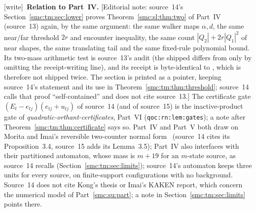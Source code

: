 \documentclass[11pt,letterpaper]{article}
\numberwithin{equation}{section}
\theoremstyle{definition}
\theoremstyle{remark}
\newcommand{\wtag}{\textup{[write]}}
\begin{document}
\wtag\ \textbf{Relation to Part~IV.} [Editorial note: source~14's Section~\ref{smc:tm:sec:lower} proves Theorem~\ref{smc:sl:thm:two} of Part~IV (source~13) again, by the same argument: the same walker maps $\alpha,d$, the same near/far threshold $2r$ and encounter inequality, the same count $|Q_2|+2r|Q_1|^2$ of near shapes, the same translating tail and the same fixed-rule polynomial bound. Its two-mass arithmetic test is source~13's audit (the shipped  differs from  only by omitting the receipt-writing line), and its receipt is byte-identical to , which is therefore not shipped twice. The section is printed as a pointer, keeping source~14's statement and its use in Theorem~\ref{smc:tm:thm:threshold}; source~14 calls that proof ``self-contained'' and does not cite source~13.] The certificate gate $(E_t-e_{tj})(e_{tj}+u_{tj})$ of source~14 (and of source~15) is the inactive-product gate of \emph{quadratic-orthant-certificates}, Part~VI (\texttt{qoc:rn:lem:gates}); a note after Theorem~\ref{smc:tm:thm:certificate} says so. Part~IV and Part~V both draw on Morita and Imai's reversible two-counter normal form~\cite{moritaimai} (source~14 cites its Proposition~3.4, source~15 adds its Lemma~3.5); Part~IV also interfaces with their partitioned automaton, whose mass is $m+19$ for an $m$-state source, as source~14 recalls (Section~\ref{smc:tm:sec:limits}); source~14's automaton keeps three units for every source, on finite-support configurations with no background. Source~14 does not cite Kong's thesis or Imai's KAKEN report, which concern the numerical model of Part~\ref{smc:su:part}; a note in Section~\ref{smc:tm:sec:limits} points there.
\end{document}
